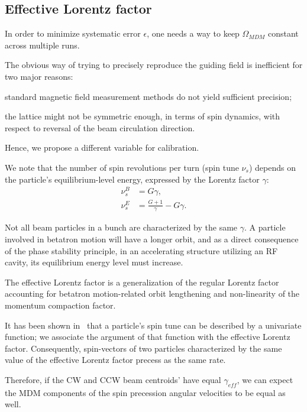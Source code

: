 \documentclass[12pt]{article}
\newcommand{\W}{\Omega}
\newcommand{\geff}{\gamma_{eff}}
\begin{document}
\subsection{Effective Lorentz factor}
%
In order to minimize systematic error $\epsilon$, one needs a way to keep $\W_{MDM}$ constant across multiple runs.

The obvious way of trying to precisely reproduce the guiding field is inefficient for two major reasons:
\begin{enumerate*}[(1)]
	\item standard magnetic field measurement methods do not yield sufficient precision;
	\item the lattice might not be symmetric enough, in terms of spin dynamics, with respect to reversal of the beam circulation direction.
\end{enumerate*}
Hence, we propose a different variable for calibration.

We note that the number of spin revolutions per turn (spin tune $\nu_s$) depends on the particle's  equilibrium-level energy, expressed by the Lorentz factor $\gamma$:
\begin{align}\label{eq:spin_tune_vs_gamma}
\nu_s^B &= G\gamma, \tag{magnetic field}\\
\nu_s^E &= \frac{G+1}{\gamma} - G\gamma. \tag{electric field}
\end{align}

Not all beam particles in a bunch are characterized by the same $\gamma$. A particle involved in betatron
motion will have a longer orbit, and as a direct consequence of the phase stability principle,
in an accelerating structure utilizing an RF cavity, its equilibrium energy level 
must increase.

The effective Lorentz factor is a generalization of the regular Lorentz factor accounting for betatron motion-related orbit lengthening and non-linearity of the momentum compaction factor.

It has been shown in~\cite[p.~56]{Aksentev:Thesis} that a particle's spin tune can be described by a univariate function; we associate the argument of that function with the effective Lorentz factor. Consequently, spin-vectors of two particles characterized by the same value of the effective Lorentz factor precess as the same rate.

Therefore, if the CW and CCW beam centroids' have equal $\geff$, we can expect the MDM components of the spin precession angular velocities to be equal as well.
\end{document}
